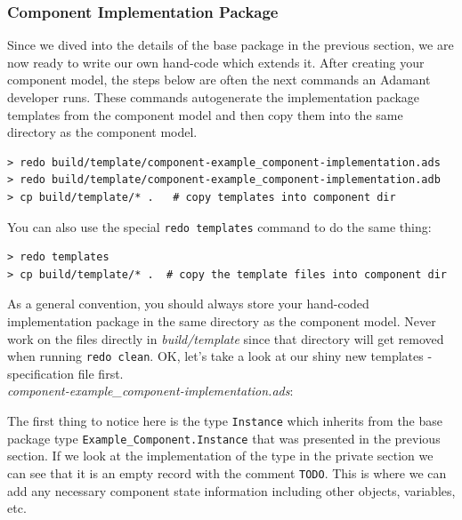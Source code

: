 \subsubsection{Component Implementation Package} \label{Component Implementation Package}

Since we dived into the details of the base package in the previous section, we are now ready to write our own hand-code which extends it. After creating your component model, the steps below are often the next commands an Adamant developer runs. These commands autogenerate the implementation package templates from the component model and then copy them into the same directory as the component model.

\vspace{5mm} %
\begin{verbatim}
> redo build/template/component-example_component-implementation.ads 
> redo build/template/component-example_component-implementation.adb 
> cp build/template/* .   # copy templates into component dir
\end{verbatim}
\vspace{5mm} %

You can also use the special \texttt{redo templates} command to do the same thing:

\vspace{5mm} %
\begin{verbatim}
> redo templates
> cp build/template/* .  # copy the template files into component dir 
\end{verbatim}
\vspace{5mm} %

As a general convention, you should always store your hand-coded implementation package in the same directory as the component model. Never work on the files directly in \textit{build/template} since that directory will get removed when running \texttt{redo clean}. OK, let's take a look at our shiny new templates - specification file first. \\

\textit{component-example\_component-implementation.ads}:

The first thing to notice here is the type \texttt{Instance} which inherits from the base package type \texttt{Example\_Component.Instance} that was presented in the previous section. If we look at the implementation of the type in the private section we can see that it is an empty record with the comment \texttt{TODO}. This is where we can add any necessary component state information including other objects, variables, etc. \\

